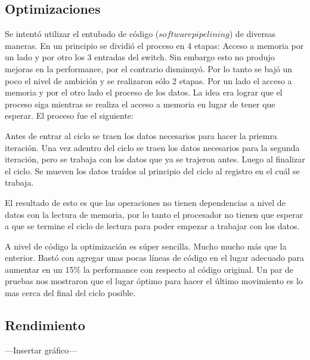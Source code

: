\subsection{Optimizaciones}

	Se intentó utilizar el entubado de código ($software pipelining$) de diversas maneras.
En un principio se dividió el proceso en 4 etapas: Acceso a memoria por un lado
y por otro los 3 entradas del switch. Sin embargo esto no produjo mejoras en la performance,
por el contrario disminuyó. Por lo tanto se bajó un poco el nivel de ambición y se realizaron
sólo 2 etapas. Por un lado el acceso a memoria y por el otro lado el proceso de los datos. La idea
era lograr que el proceso siga mientras se realiza el acceso a memoria en lugar de tener que esperar.
El proceso fue el siguiente:

	Antes de entrar al ciclo se traen los datos necesarios para hacer la priemra iteración.
Una vez adentro del ciclo se traen los datos necesarios para la segunda iteración, pero
se trabaja con los datos que ya se trajeron antes. Luego al finalizar el ciclo.
Se mueven los datos traídos al principio del ciclo al registro en el cuál se trabaja.

	El resultado de esto es que las operaciones no tienen dependencias a nivel de datos con
la lectura de memoria, por lo tanto el procesador no tienen que esperar a que se termine el ciclo
de lectura para poder empezar a trabajar con los datos.

	A nivel de código la optimización es súper sencilla. Mucho mucho más que la enterior.
Bastó con agregar unas pocas líneas de código en el lugar adecuado para aumentar en un 15\% la performance
con respecto al código original. Un par de pruebas nos mostraron que el lugar óptimo para hacer el último
movimiento es lo mas cerca del final del ciclo posible.

\subsection{Rendimiento}


---Insertar gráfico---

	
